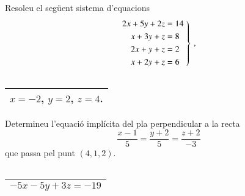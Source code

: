 \documentclass[11pt,catalan]{article}
\begin{document}
\begin{enunciat}
Resoleu el següent sistema d'equacions
\[
  \left.\aligned 2 x + 5 y + 2 z &= 14 \\ x + 3 y + z &= 8 \\ 2 x + y + z &= 2 \\ x + 2 y + z &= 6 \endaligned\;\right\}\,,
\]
\end{enunciat}

\begin{quadricula}
\begin{tabular}{|C{5cm}{0.5cm}|}
\hline
  \\
\hline
\end{tabular}
\end{quadricula}

\begin{solucio}
\begin{center}
\begin{tabular}{|C{5cm}{0.5cm}|}
\hline
$x=-2$, $y=2$, $z=4$. \\
\hline
\end{tabular}
\end{center}
\end{solucio}


\begin{enunciat}
Determineu l'equació implícita del pla perpendicular a la recta 
\[
  \frac{x - 1}{5} = \frac{y + 2}{5} = \frac{z + 2}{-3}
\]
que passa pel punt $(4,1,2)$.
\end{enunciat}

\begin{quadricula}
\begin{tabular}{|C{5cm}{0.5cm}|}
\hline
  \\
\hline
\end{tabular}
\end{quadricula}

\begin{solucio}
\begin{center}
\begin{tabular}{|C{5cm}{0.5cm}|}
\hline
$- 5 x - 5 y + 3 z = -19$ \\
\hline
\end{tabular}
\end{center}
\end{solucio}
\end{document}
